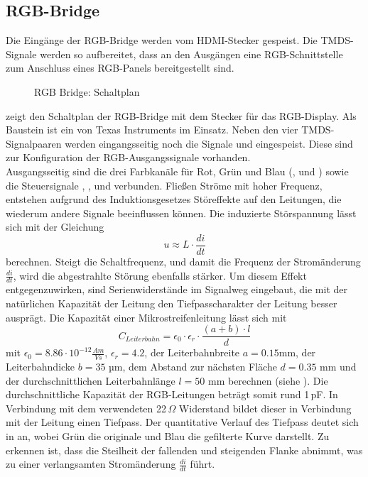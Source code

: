 \subsection{RGB-Bridge}
Die Eingänge der RGB-Bridge werden vom HDMI-Stecker gespeist. Die TMDS-Signale werden so aufbereitet, dass an den Ausgängen eine RGB-Schnittstelle zum Anschluss eines RGB-Panels bereitgestellt sind.
        \begin{figure}[htp]
        	\center
            \caption{RGB Bridge: Schaltplan}
            \label{fig:teilb_rgb_bridge_sch}
        \end{figure}
\newline        
{} zeigt den Schaltplan der RGB-Bridge mit dem Stecker für das RGB-Display. Als Baustein ist ein  von Texas Instruments im Einsatz. Neben den vier TMDS-Signalpaaren werden eingangsseitig noch die Signale  und  eingespeist. Diese sind zur Konfiguration der RGB-Ausgangssignale vorhanden. \\
Ausgangsseitig sind die drei Farbkanäle für Rot, Grün und Blau (,  und ) sowie die Steuersignale , ,  und  verbunden.
Fließen Ströme mit hoher Frequenz, entstehen aufgrund des Induktionsgesetzes Störeffekte auf den Leitungen, die wiederum andere Signale beeinflussen können. Die induzierte Störspannung lässt sich mit der Gleichung
%
\begin{equation}
u \approx L \cdot \frac{di}{dt}
\label{equ:induzierte_spannung}
\end{equation}
%
berechnen. Steigt die Schaltfrequenz, und damit die Frequenz der Stromänderung $\frac{di}{dt}$, wird die abgestrahlte Störung ebenfalls stärker. Um diesem Effekt entgegenzuwirken, sind Serienwiderstände im Signalweg eingebaut, die mit der natürlichen Kapazität der Leitung den Tiefpasscharakter der Leitung besser ausprägt. Die Kapazität einer Mikrostreifenleitung lässt sich mit 
%
\begin{equation}
C_{Leiterbahn} = \epsilon_0 \cdot \epsilon_r \cdot \frac{(a+b) \cdot l}{d}
\label{equ:c_leiterbahn}
\end{equation}
%
mit $\epsilon_0 = 8.86\cdot10^{-12} \frac{Am}{Vs}$, $\epsilon_r = 4.2$, der Leiterbahnbreite $a = 0.15 $mm, der Leiterbahndicke $b = 35$ µm, dem Abstand zur nächsten Fläche $d = 0.35$ mm und der durchschnittlichen Leiterbahnlänge $l = 50$ mm berechnen (siehe \cite{Gensicke2014}). Die durchschnittliche Kapazität der RGB-Leitungen beträgt somit rund 1\,pF. In Verbindung mit dem verwendeten 22\,$\Omega$ Widerstand bildet dieser in Verbindung mit der Leitung einen Tiefpass. Der quantitative Verlauf des Tiefpass deutet sich in  an, wobei Grün die originale und Blau die gefilterte Kurve darstellt. Zu erkennen ist, dass die Steilheit der fallenden und steigenden Flanke abnimmt, was zu einer verlangsamten Stromänderung $\frac{di}{dt}$ führt.
